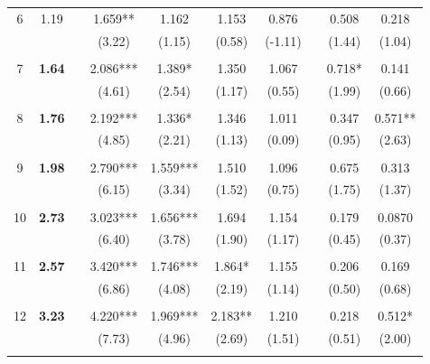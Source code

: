 \documentclass[12pt]{amsart}
\begin{document}
\begin{table}[htbp]
{\begin{tabular}{cccccccccc}
    6     & 1.19  &       & 1.659** & 1.162 & 1.153 & 0.876 &       & 0.508 & 0.218 \\
          &       &       & (3.22) & (1.15) & (0.58) & (-1.11) &       & (1.44) & (1.04) \\
          &       &       &       &       &       &       &       &       &  \\
    7     & \textbf{1.64} &       & 2.086*** & 1.389* & 1.350 & 1.067 &       & 0.718* & 0.141 \\
          &       &       & (4.61) & (2.54) & (1.17) & (0.55) &       & (1.99) & (0.66) \\
          &       &       &       &       &       &       &       &       &  \\
    8     & \textbf{1.76} &       & 2.192*** & 1.336* & 1.346 & 1.011 &       & 0.347 & 0.571** \\
          &       &       & (4.85) & (2.21) & (1.13) & (0.09) &       & (0.95) & (2.63) \\
          &       &       &       &       &       &       &       &       &  \\
    9     & \textbf{1.98} &       & 2.790*** & 1.559*** & 1.510 & 1.096 &       & 0.675 & 0.313 \\
          &       &       & (6.15) & (3.34) & (1.52) & (0.75) &       & (1.75) & (1.37) \\
          &       &       &       &       &       &       &       &       &  \\
    10    & \textbf{2.73} &       & 3.023*** & 1.656*** & 1.694 & 1.154 &       & 0.179 & 0.0870 \\
          &       &       & (6.40) & (3.78) & (1.90) & (1.17) &       & (0.45) & (0.37) \\
          &       &       &       &       &       &       &       &       &  \\
    11    & \textbf{2.57} &       & 3.420*** & 1.746*** & 1.864* & 1.155 &       & 0.206 & 0.169 \\
          &       &       & (6.86) & (4.08) & (2.19) & (1.14) &       & (0.50) & (0.68) \\
          &       &       &       &       &       &       &       &       &  \\
    12    & \textbf{3.23} &       & 4.220*** & 1.969*** & 2.183** & 1.210 &       & 0.218 & 0.512* \\
          &       &       & (7.73) & (4.96) & (2.69) & (1.51) &       & (0.51) & (2.00) \\
          &       &       &       &       &       &       &       &       &  \\
    \hline\hline
    \end{tabular}%
    }
  \label{tab:addlabel}%
\end{table}%
\end{document}
